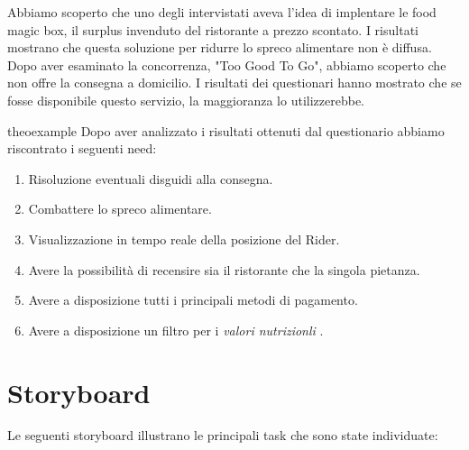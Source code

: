 \documentclass{article}
\begin{document}
Abbiamo scoperto che uno degli intervistati aveva l'idea di implentare le food magic box, il surplus invenduto del ristorante a prezzo scontato. I risultati mostrano che questa soluzione per ridurre lo spreco alimentare non è diffusa. Dopo aver esaminato la concorrenza, "Too Good To Go", abbiamo scoperto che non offre la consegna a domicilio. I risultati dei questionari hanno mostrato che se fosse disponibile questo servizio, la maggioranza lo utilizzerebbe.
\vspace{1.5cm}
\begin{need}{}{theoexample}
    Dopo aver analizzato i risultati ottenuti dal questionario abbiamo riscontrato i seguenti need:
    \begin{enumerate}
        \item Risoluzione eventuali disguidi alla consegna.
        \item Combattere lo spreco alimentare.
        \item Visualizzazione in tempo reale della posizione del Rider.
        \item Avere la possibilità di recensire sia il ristorante che la singola pietanza.
        \item Avere a disposizione tutti i principali metodi di pagamento.
        \item Avere a disposizione un filtro per i \textit{valori nutrizionli} .
    \end{enumerate}
    \end{need}

    \vspace{1cm}
\vspace{4cm}
\pagebreak
\section{Storyboard} \par
Le seguenti storyboard illustrano le principali task che sono state individuate:
\end{document}

